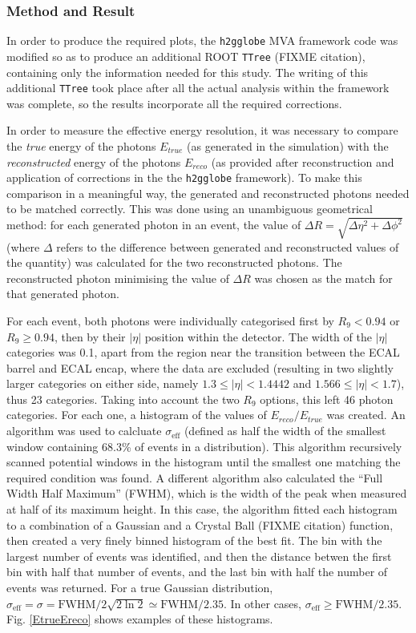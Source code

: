 \documentclass[10pt]{article}
\begin{document}
\subsubsection{Method and Result}

In order to produce the required plots, the \texttt{h2gglobe} MVA framework code was modified so as to produce an additional ROOT \texttt{TTree} (FIXME citation), containing only the information needed for this study. The writing of this additional \texttt{TTree} took place after all the actual analysis within the framework was complete, so the results incorporate all the required corrections.

In order to measure the effective energy resolution, it was necessary to compare the \textit{true} energy of the photons $E_{true}$ (as generated in the simulation) with the \textit{reconstructed} energy of the photons $E_{reco}$ (as provided after reconstruction and application of corrections in the the \texttt{h2gglobe} framework). To make this comparison in a meaningful way, the generated and reconstructed photons needed to be matched correctly. This was done using an unambiguous geometrical method: for each generated photon in an event, the value of $\Delta R = \sqrt{\Delta \eta^2 + \Delta \phi^2}$ (where $\Delta $ refers to the difference between generated and reconstructed values of the quantity) was calculated for the two reconstructed photons. The reconstructed photon minimising the value of $\Delta R$ was chosen as the match for that generated photon.

For each event, both photons were individually categorised first by $R_{9} <0.94$ or $R_{9} \geq 0.94$, then by their $|\eta|$ position within the detector. The width of the $|\eta|$ categories was 0.1, apart from the region near the transition between the ECAL barrel and ECAL encap, where the data are excluded (resulting in two slightly larger categories on either side, namely $ 1.3 \leq |\eta| < 1.4442 $ and $1.566 \leq |\eta| < 1.7$), thus 23 categories. Taking into account the two $R_{9}$ options, this left 46 photon categories. For each one, a histogram of the values of $E_{reco}/E_{true}$ was created. An algorithm was used to calcluate $\sigma_{\text{eff}}$ (defined as half the width of the smallest window containing 68.3\% of events in a distribution). This algorithm recursively scanned potential windows in the histogram until the smallest one matching the required condition was found. A different algorithm also calculated the ``Full Width Half Maximum'' (FWHM), which is the width of the peak when measured at half of its maximum height. In this case, the algorithm fitted each histogram to a combination of a Gaussian and a Crystal Ball (FIXME citation) function, then created a very finely binned histogram of the best fit. The bin with the largest number of events was identified, and then the distance betwen the first bin with half that number of events, and the last bin with half the number of events was returned. For a true Gaussian distribution, $\sigma_{\text{eff}} = \sigma = \text{FWHM}/2\sqrt{2\ln2} \simeq \text{FWHM}/2.35$. In other cases, $\sigma_{\text{eff}} \geq \text{FWHM}/2.35$. Fig. \ref{EtrueEreco} shows examples of these histograms. 
\end{document}
